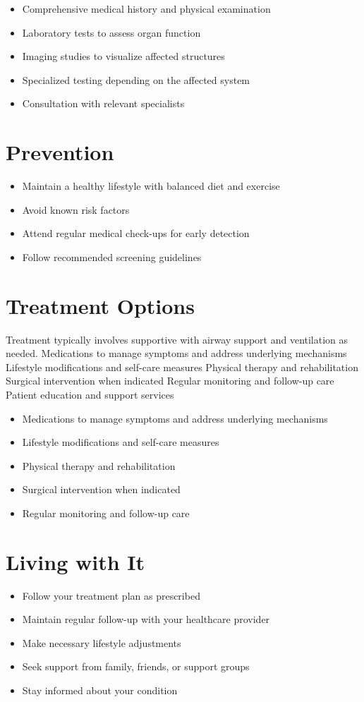 \begin{itemize}[noitemsep]
  \item Comprehensive medical history and physical examination
  \item Laboratory tests to assess organ function
  \item Imaging studies to visualize affected structures
  \item Specialized testing depending on the affected system
  \item Consultation with relevant specialists
\end{itemize}
\section{Prevention}
\begin{itemize}[noitemsep]
  \item Maintain a healthy lifestyle with balanced diet and exercise
  \item Avoid known risk factors
  \item Attend regular medical check-ups for early detection
  \item Follow recommended screening guidelines
\end{itemize}
\section{Treatment Options}
Treatment typically involves supportive with airway support and ventilation as needed. Medications to manage symptoms and address underlying mechanisms Lifestyle modifications and self-care measures Physical therapy and rehabilitation Surgical intervention when indicated Regular monitoring and follow-up care Patient education and support services

\begin{itemize}[noitemsep]
  \item Medications to manage symptoms and address underlying mechanisms
  \item Lifestyle modifications and self-care measures
  \item Physical therapy and rehabilitation
  \item Surgical intervention when indicated
  \item Regular monitoring and follow-up care
\end{itemize}
\section{Living with It}
\begin{itemize}[noitemsep]
  \item Follow your treatment plan as prescribed
  \item Maintain regular follow-up with your healthcare provider
  \item Make necessary lifestyle adjustments
  \item Seek support from family, friends, or support groups
  \item Stay informed about your condition
\end{itemize}
